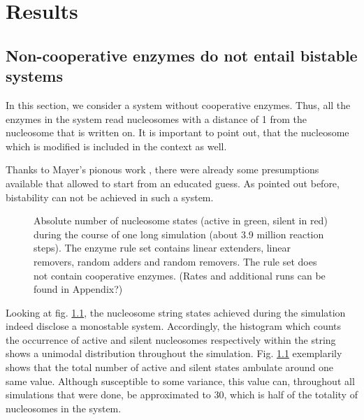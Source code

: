 \chapter{Results}
    \label{cha:results}
    \section{Non-cooperative enzymes do not entail bistable systems}
        \label{sec:ResNon-cooperative}
        In this section, we consider a system without cooperative enzymes. Thus, all the enzymes in the system read nucleosomes with a distance of 1 from the nucleosome that is written on. It is important to point out, that the nucleosome which is modified is included in the context as well.

        Thanks to Mayer's pionous work \cite{mayer2020langevin}, there were already some presumptions available that allowed to start from an educated guess. As pointed out before, bistability can not be achieved in such a system.\\
        \begin{figure}[!htbp]
            \centering
            \caption{Absolute number of nucleosome states (active in green, silent in red) during the course of one long simulation (about 3.9 million reaction steps). The enzyme rule set contains linear extenders, linear removers, random adders and random removers. The rule set does not contain cooperative enzymes. {\color{red} (Rates and additional runs can be found in Appendix?)\color{black}}}
            \label{img:nonCoopSim}
        \end{figure}
        Looking at fig. \ref{img:nonCoopSim}, the nucleosome string states achieved during the simulation indeed disclose a monostable system. Accordingly, the histogram which counts the occurrence of active and silent nucleosomes respectively within the string  shows a unimodal distribution throughout the simulation.
        Fig. \ref{img:nonCoopSim} exemplarily shows that the total number of active and silent states ambulate around one same value. Although susceptible to some variance, this value can, throughout all simulations that were done, be approximated to 30, which is half of the totality of nucleosomes in the system. %

